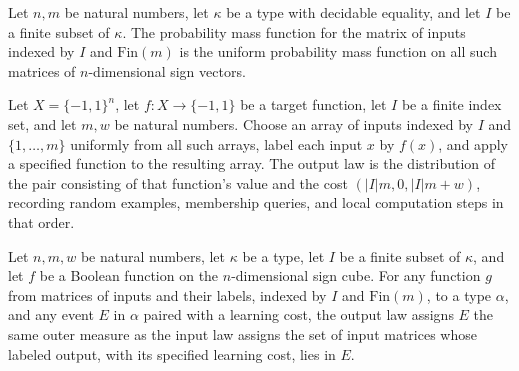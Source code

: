 \begin{theorem}
\label{FABL.LearningProgram.randomExampleMatrixInputLaw_eq_uniformPMF}
\leanok
{}
Let $n,m$ be natural numbers, let $\kappa$ be a type with decidable equality, and let
$I$ be a finite subset of $\kappa$. The probability mass function for the matrix of
inputs indexed by $I$ and $\mathrm{Fin}(m)$ is the uniform probability mass function on
all such matrices of $n$-dimensional sign vectors.
\end{theorem}

\begin{definition}
\label{FABL.LearningProgram.randomExampleMatrixOutputLaw}
\leanok
{}
Let $X=\{-1,1\}^n$, let $f:X\to\{-1,1\}$ be a target function, let $I$ be a finite index
set, and let $m,w$ be natural numbers. Choose an array of inputs indexed by $I$ and
$\{1,\ldots,m\}$ uniformly from all such arrays, label each input $x$ by $f(x)$, and
apply a specified function to the resulting array. The output law is the distribution of
the pair consisting of that function’s value and the cost $(|I|m,0,|I|m+w)$, recording
random examples, membership queries, and local computation steps in that order.
\end{definition}

\begin{theorem}
\label{FABL.LearningProgram.randomExampleMatrixOutputLaw_toOuterMeasure_apply}
\leanok
{}
Let $n,m,w$ be natural numbers, let $\kappa$ be a type, let $I$ be a finite subset of
$\kappa$, and let $f$ be a Boolean function on the $n$-dimensional sign cube. For any
function $g$ from matrices of inputs and their labels, indexed by $I$ and
$\mathrm{Fin}(m)$, to a type $\alpha$, and any event $E$ in $\alpha$ paired with a
learning cost, the output law assigns $E$ the same outer measure as the input law
assigns the set of input matrices whose labeled output, with its specified learning
cost, lies in $E$.
\end{theorem}

